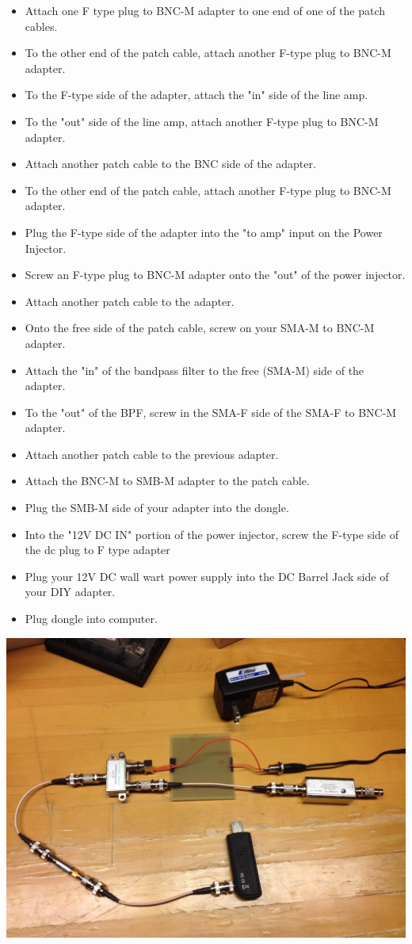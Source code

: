 \documentclass[11pt]{article} %
\begin{document}
\begin{itemize}
\item Attach one F type plug to BNC-M adapter to one end of one of the patch cables.
\item To the other end of the patch cable, attach another F-type plug to BNC-M adapter.
\item To the F-type side of the adapter, attach the "in" side of the line amp.
\item To the "out" side of the line amp, attach another F-type plug to BNC-M adapter.
\item Attach another patch cable to the BNC side of the adapter.
\item To the other end of the patch cable, attach another F-type plug to BNC-M adapter.
\item Plug the F-type side of the adapter into the "to amp" input on the Power Injector.
\item Screw an F-type plug to BNC-M adapter onto the "out" of the power injector.
\item Attach another patch cable to the adapter.
\item Onto the free side of the patch cable, screw on your SMA-M to BNC-M adapter.
\item Attach the "in" of the bandpass filter to the free (SMA-M) side of the adapter.
\item To the "out" of the BPF, screw in the SMA-F side of the SMA-F to BNC-M adapter.
\item Attach another patch cable to the previous adapter.
\item Attach the BNC-M to SMB-M adapter to the patch cable.
\item Plug the SMB-M side of your adapter into the dongle.
\item Into the "12V DC IN" portion of the power injector, screw the F-type side of the dc plug to F type adapter
\item Plug your 12V DC wall wart power supply into the DC Barrel Jack side of your DIY adapter.
\item Plug dongle into computer.
\end{itemize}

\begin{center}
\includegraphics[scale=0.20]{lnainterface/05.jpeg}
\end{center}
\end{document}
